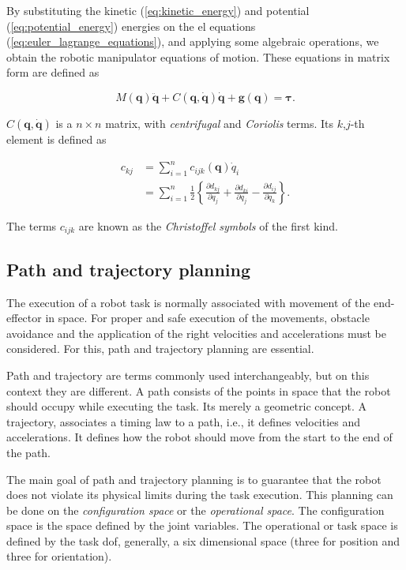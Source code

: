 By substituting the kinetic (\ref{eq:kinetic_energy}) and potential (\ref{eq:potential_energy}) energies on the \gls{el} equations (\ref{eq:euler_lagrange_equations}), and applying some algebraic operations, we obtain the robotic manipulator equations of motion. These equations in matrix form are defined as

\begin{equation}
    \label{eq:equations_motion}
    M(\boldsymbol{q})\ddot{\boldsymbol{q}} + C(\boldsymbol{q}, \dot{\boldsymbol{q}})\dot{\boldsymbol{q}} + \boldsymbol{g}(\boldsymbol{q}) = \boldsymbol{\tau}.
\end{equation}

$C(\boldsymbol{q}, \dot{\boldsymbol{q}})$ is a $n \times n$ matrix, with \emph{centrifugal} and \emph{Coriolis} terms. Its $k$,$j$-th element is defined as

\begin{align}
    c_{kj} &= \sum^n_{i=1} c_{ijk}(\boldsymbol{q})\dot{q}_i \\
    &= \sum^n_{i=1} \frac{1}{2} \left\{ \frac{\partial d_{kj}}{\partial q_j} + \frac{\partial d_{ki}}{\partial q_j} - \frac{\partial d_{ij}}{\partial q_k} \right\}.
\end{align}

The terms $c_{ijk}$ are known as the \emph{Christoffel symbols} of the first kind.


\subsection{Path and trajectory planning}
\label{subsec:path_trajectory_planning}

The execution of a robot task is normally associated with movement of the end-effector in space. For proper and safe execution of the movements, obstacle avoidance and the application of the right velocities and accelerations must be considered. For this, path and trajectory planning are essential.

Path and trajectory are terms commonly used interchangeably, but on this context they are different. A path consists of the points in space that the robot should occupy while executing the task. Its merely a geometric concept. A trajectory, associates a timing law to a path, i.e., it defines velocities and accelerations. It defines how the robot should move from the start to the end of the path.

The main goal of path and trajectory planning is to guarantee that the robot does not violate its physical limits during the task execution. This planning can be done on the \emph{configuration space} or the \emph{operational space}. The configuration space is the space defined by the joint variables. The operational or task space is defined by the task \gls{dof}, generally, a six dimensional space (three for position and three for orientation).

